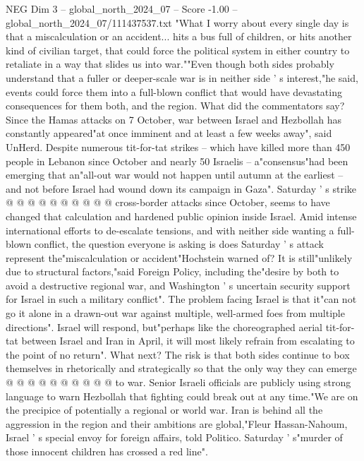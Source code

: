 \begin{textsample}{NEG Dim 3 – global\_north\_2024\_07 – Score -1.00 – global\_north\_2024\_07/111437537.txt}  \label{ex:f3_neg_374}
"What I worry about every single day is that a miscalculation or an accident... hits a bus full of children, or hits another kind of civilian target, that could force the political system in either country to retaliate in a way that slides us into war.""Even though both sides probably understand that a fuller or deeper-scale war is in neither side ' s interest,"he said, events could force them into a full-blown conflict that would have devastating consequences for them both, and the region.
What did the commentators say?
Since the Hamas attacks on 7 October, war between Israel and Hezbollah has constantly appeared"at once imminent and at least a few weeks away", said UnHerd.
Despite numerous tit-for-tat strikes -- which have killed more than 450 people in Lebanon since October and nearly 50 Israelis -- a"consensus"had been emerging that an"all-out war would not happen until autumn at the earliest -- and not before Israel had wound down its campaign in Gaza".
Saturday ' s strike @ @ @ @ @ @ @ @ @ @ cross-border attacks since October, seems to have changed that calculation and hardened public opinion inside Israel.
Amid intense international efforts to de-escalate tensions, and with neither side wanting a full-blown conflict, the question everyone is asking is does Saturday ' s attack represent the"miscalculation or accident"Hochstein warned of?
It is still"unlikely due to structural factors,"said Foreign Policy, including the"desire by both to avoid a destructive regional war, and Washington ' s uncertain security support for Israel in such a military conflict".
The problem facing Israel is that it"can not go it alone in a drawn-out war against multiple, well-armed foes from multiple directions".
Israel will respond, but"perhaps like the choreographed aerial tit-for-tat between Israel and Iran in April, it will most likely refrain from escalating to the point of no return".
What next?
The risk is that both sides continue to box themselves in rhetorically and strategically so that the only way they can emerge @ @ @ @ @ @ @ @ @ @ to war.
Senior Israeli officials are publicly using strong language to warn Hezbollah that fighting could break out at any time."We are on the precipice of potentially a regional or world war.
Iran is behind all the aggression in the region and their ambitions are global,"Fleur Hassan-Nahoum, Israel ' s special envoy for foreign affairs, told Politico.
Saturday ' s"murder of those innocent children has crossed a red line".

\end{textsample}
